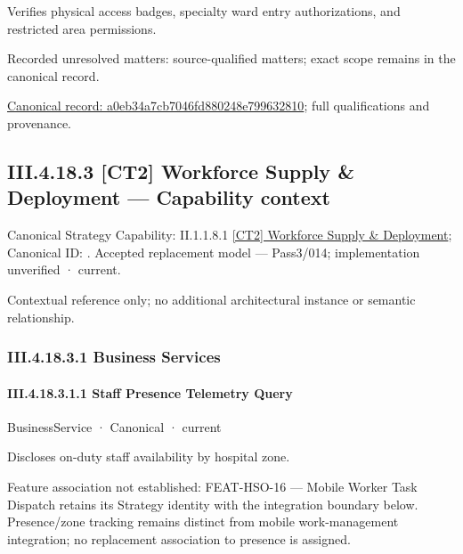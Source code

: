 Verifies physical access badges, specialty ward entry authorizations, and restricted area permissions.


{\small Recorded unresolved matters: source-qualified matters; exact scope remains in the canonical record.}\par
{\footnotesize \href{../../../../continuum/business/business-function/a0eb34a7cb7046fd880248e799632810.md}{Canonical record: a0eb34a7cb7046fd880248e799632810}; full qualifications and provenance.}\par
\subsection*{III.4.18.3 [CT2] Workforce Supply \& Deployment — Capability context}
\label{navigation:III.4.18.3}

{\small Canonical Strategy Capability: II.1.1.8.1 \hyperref[element:eacad022ee104fb3a6b21791a7abf19f]{[CT2] Workforce Supply \& Deployment}; Canonical ID: \texttt{}. Accepted replacement model — Pass3/014; implementation unverified · current.}\par
Contextual reference only; no additional architectural instance or semantic relationship.\par
\subsubsection*{III.4.18.3.1 Business Services}
\label{navigation:III.4.18.3.1}

\paragraph*{III.4.18.3.1.1 Staff Presence Telemetry Query}
\label{navigation:III.4.18.3.1.1}

\label{element:b3cd0d8e40f44b9fa2b64367237345fa}
{\small BusinessService · Canonical · current}\par

Discloses on-duty staff availability by hospital zone.



Feature association not established: FEAT-HSO-16 — Mobile Worker Task Dispatch retains its Strategy identity with the integration boundary below. Presence/zone tracking remains distinct from mobile work-management integration; no replacement association to presence is assigned.



